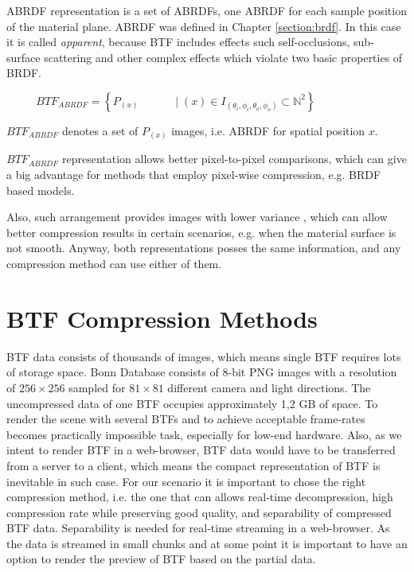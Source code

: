  ABRDF representation is a set of ABRDFs, one ABRDF for each sample position of the material plane. 
 ABRDF was defined in Chapter \ref{section:brdf}. In this case it is called \emph{apparent}, 
 because BTF includes effects such self-occlusions, sub-surface scattering and other complex effects which violate two basic properties of BRDF.
 
 {\centering $\,\,\,\,\,\,\,\,\,\,\,\,\,\,\,\,BTF_{ABRDF}=\left \{P_{(x) } \,\,\,\,\,\,\,\,\,\,\,\,\,\,\,\,\,\,\mid  (x)\in I_{(\theta_{i} ,\phi_{i},\theta_{o} ,\phi_{o})}\subset \mathbb{N}^{2}\right \}$ \\}
 
 $BTF_{ABRDF}$ denotes a set of $P_{(x)}$ images, i.e. ABRDF for spatial position $x$.


 $BTF_{ABRDF}$ representation allows better pixel-to-pixel comparisons, which can give a big advantage for methods that employ pixel-wise compression, e.g. BRDF based models.

Also, such arrangement provides images with lower variance \cite{haindl}, which can allow better compression results in certain scenarios, e.g. when the material surface is not smooth.
Anyway, both representations posses the same information, and any compression method can use either of them.
 
\section{BTF Compression Methods}
\label{chapter:compression_methods}



 BTF data consists of thousands of images, which means single BTF requires lots of storage space.
Bonn  Database \cite{btfBonn} consists of 8-bit PNG images with a resolution of $256\times256$ sampled for $81\times81$ different camera and light directions.
 The uncompressed data of one BTF occupies approximately 1,2 GB of space.
 To render the scene with several BTFs and to achieve acceptable frame-rates becomes practically impossible task, especially for low-end hardware.
 Also, as we intent to render BTF in a web-browser, BTF data would have to be transferred from a server to a client, which means the compact representation of BTF is inevitable in such case.
 For our scenario it is important to chose the right compression method, i.e. the one that can allows real-time decompression, high compression rate while preserving good quality, and separability of compressed BTF data.
 Separability is needed for real-time streaming in a web-browser.  
 As the data is streamed in small chunks and at some point it is important to have an option to render the preview of BTF based on the partial data.

